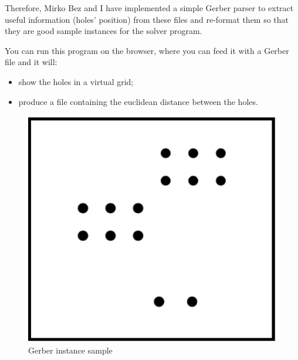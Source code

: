 Therefore, Mirko Bez and I have implemented a simple Gerber parser to extract
useful information (holes' position) from these files and re-format them so
that they are good sample instances for the solver program.

You can run this program on the browser, where you can feed it with a Gerber
file and it will:
\begin{itemize}
	\item show the holes in a virtual grid;
	\item produce a file containing the euclidean distance between the holes.
\end{itemize}

\begin{figure}[H]
  \centering
  \includegraphics[width=.5\columnwidth]{pics/gerber.eps}
  \caption{Gerber instance sample}
  \label{fig:gerber-instance-pic}
\end{figure}
